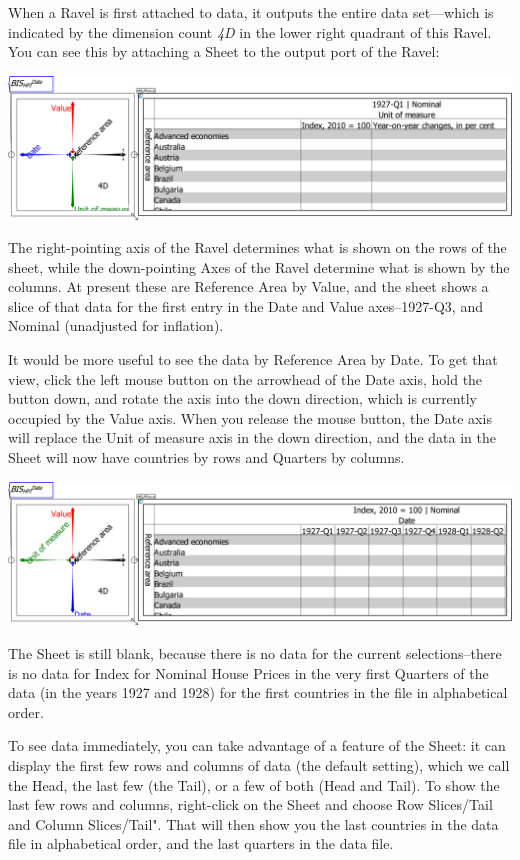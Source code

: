 When a Ravel is first attached to data, it outputs the entire data
set---which is indicated by the dimension count \emph{4D} in the
lower right quadrant of this Ravel. You can see this by attaching
a Sheet to the output port of the Ravel:

\noindent\includegraphics[width=\textwidth]{images/tut01Ravel4DwithSheet}

The right-pointing axis of the Ravel determines what is shown on the
rows of the sheet, while the down-pointing Axes of the Ravel determine
what is shown by the columns. At present these are Reference Area
by Value, and the sheet shows a slice of that data for the first entry
in the Date and Value axes--1927-Q3, and Nominal (unadjusted for
inflation).

It would be more useful to see the data by Reference Area by Date.
To get that view, click the left mouse button on the arrowhead of
the Date axis, hold the button down, and rotate the axis into the
down direction, which is currently occupied by the Value axis. When
you release the mouse button, the Date axis will replace the Unit
of measure axis in the down direction, and the data in the Sheet will
now have countries by rows and Quarters by columns.

\noindent\includegraphics[width=\textwidth]{images/tut02HPI4DwithSheetRotatedCountryDate}

The Sheet is still blank, because there is no data for the current
selections--there is no data for Index for Nominal House Prices in
the very first Quarters of the data (in the years 1927 and 1928) for
the first countries in the file in alphabetical order.

To see data immediately, you can take advantage of a feature of the
Sheet: it can display the first few rows and columns of data (the
default setting), which we call the Head, the last few (the Tail),
or a few of both (Head and Tail). To show the last few rows and columns,
right-click on the Sheet and choose Row Slices/Tail and Column Slices/Tail".
That will then show you the last countries in the data file in alphabetical
order, and the last quarters in the data file.


